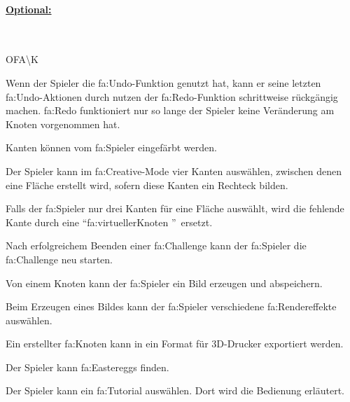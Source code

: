 %
%
\paragraph*{\underline{Optional:}}~\\


\begin{ids}{\gls{OFA\K}}

	\id[ 190] Wenn der Spieler die \gls{fa:Undo}-Funktion genutzt hat, kann er seine letzten \gls{fa:Undo}-Aktionen durch nutzen der \gls{fa:Redo}-Funktion schrittweise rückgängig machen. {\gls{fa:Redo}} funktioniert nur so lange der Spieler keine Veränderung am Knoten vorgenommen hat.
	
 	\id[ 200] Kanten können vom \gls{fa:Spieler} eingefärbt werden.
 	
 	\id[ 210] Der Spieler kann im \gls{fa:Creative}-Mode vier Kanten auswählen, zwischen denen eine Fläche erstellt wird, sofern diese Kanten ein Rechteck bilden.
 	
 	\id[ 220] Falls der \gls{fa:Spieler} nur drei Kanten für eine Fläche auswählt, wird  die fehlende Kante durch eine \textquotedblleft \gls{fa:virtuellerKnoten} \textquotedblright~ersetzt.
 	
	\id [230] Nach erfolgreichem Beenden einer \gls{fa:Challenge} kann der \gls{fa:Spieler} die \gls{fa:Challenge} neu starten.
	
 	\id[ 240] Von einem Knoten kann der \gls{fa:Spieler} ein Bild erzeugen und abspeichern.
 	
 	\id[ 250] Beim Erzeugen eines Bildes kann der \gls{fa:Spieler} verschiedene \gls{fa:Rendereffekte} auswählen.
 	
 	\id[ 260] Ein erstellter \gls{fa:Knoten} kann in ein Format für 3D-Drucker exportiert werden.
 	
 	\id[ 270] Der Spieler kann \gls{fa:Easteregg}s finden.
 	
 	\id[ 275] Der Spieler kann ein \gls{fa:Tutorial} auswählen. Dort wird die Bedienung erläutert.
	
\end{ids}


